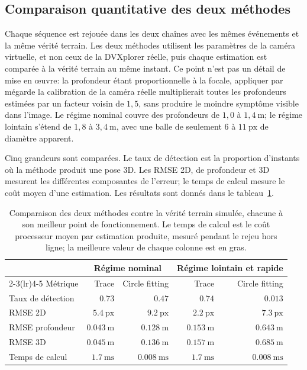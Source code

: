 \documentclass[a4paper,11pt]{report}
\begin{document}
\subsection{Comparaison quantitative des deux méthodes}
\label{sec:comparaison-quantitative}

Chaque séquence est rejouée dans les deux chaînes avec les mêmes événements et
la même vérité terrain. Les deux méthodes utilisent les paramètres de la caméra
virtuelle, et non ceux de la DVXplorer réelle, puis chaque estimation est
comparée à la vérité terrain au même instant. Ce point n'est pas un détail de
mise en œuvre: la profondeur étant proportionnelle à la focale, appliquer par
mégarde la calibration de la caméra réelle multiplierait toutes les profondeurs
estimées par un facteur voisin de \(1{,}5\), sans produire le moindre symptôme
visible dans l'image. Le régime nominal couvre des
profondeurs de \(1{,}0\) à \(1{,}4~\text{m}\); le régime lointain s'étend de
\(1{,}8\) à \(3{,}4~\text{m}\), avec une balle de seulement \(6\) à
\(11~\text{px}\) de diamètre apparent.

Cinq grandeurs sont comparées. Le taux de détection est la proportion
d'instants où la méthode produit une pose 3D. Les RMSE 2D, de profondeur et 3D
mesurent les différentes composantes de l'erreur; le temps de calcul mesure le
coût moyen d'une estimation. Les résultats sont donnés dans le
tableau~\ref{tab:benchmark-trace-circle}.

\begin{table}[H]
  \centering
  \caption{Comparaison des deux méthodes contre la vérité terrain simulée, chacune à son meilleur point de fonctionnement. Le temps de calcul est le coût processeur moyen par estimation produite, mesuré pendant le rejeu hors ligne; la meilleure valeur de chaque colonne est en gras.}
  \label{tab:benchmark-trace-circle}
  \begin{tabular}{lrrrr}
    \toprule
    & \multicolumn{2}{c}{Régime nominal} & \multicolumn{2}{c}{Régime lointain et rapide} \\
    \cmidrule(lr){2-3}\cmidrule(lr){4-5}
    Métrique & Trace & Circle fitting & Trace & Circle fitting \\
    \midrule
    Taux de détection  & \(\mathbf{0.73}\)  & \(0.47\)  & \(\mathbf{0.74}\)  & \(0.013\) \\
    RMSE 2D            & \(\mathbf{5.4}~\text{px}\) & \(9.2~\text{px}\) & \(\mathbf{2.2}~\text{px}\) & \(7.3~\text{px}\) \\
    RMSE profondeur    & \(\mathbf{0.043}~\text{m}\) & \(0.128~\text{m}\) & \(\mathbf{0.153}~\text{m}\) & \(0.643~\text{m}\) \\
    RMSE 3D            & \(\mathbf{0.045}~\text{m}\) & \(0.136~\text{m}\) & \(\mathbf{0.157}~\text{m}\) & \(0.685~\text{m}\) \\
    Temps de calcul    & \(1.7~\text{ms}\) & \(\mathbf{0.008}~\text{ms}\) & \(1.7~\text{ms}\) & \(\mathbf{0.008}~\text{ms}\) \\
    \bottomrule
  \end{tabular}
\end{table}
\end{document}
